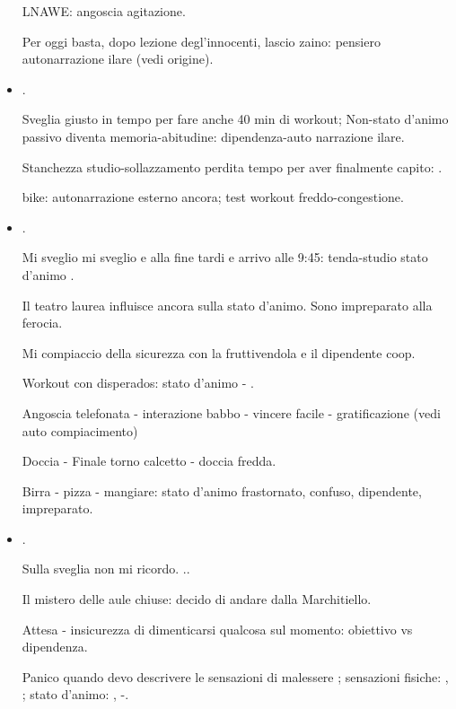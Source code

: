 \begin{itemize}
LNAWE: angoscia agitazione.

Per oggi basta, dopo lezione degl'innocenti, lascio zaino: pensiero autonarrazione ilare (vedi origine).

\item {}.

Sveglia giusto in tempo per fare anche 40 min di workout; Non-stato d'animo passivo diventa memoria-abitudine: dipendenza-auto narrazione ilare.

Stanchezza studio-sollazzamento perdita tempo per aver finalmente capito: .

 bike: autonarrazione esterno ancora; test workout freddo-congestione.

\item {}.

Mi sveglio mi sveglio e alla fine tardi e arrivo alle 9:45: tenda-studio stato d'animo .

Il teatro laurea influisce ancora sulla stato d'animo. Sono impreparato alla ferocia.

Mi compiaccio della sicurezza con la fruttivendola e il dipendente coop.

Workout con disperados: stato d'animo - .

Angoscia telefonata - interazione babbo - vincere facile - gratificazione (vedi auto compiacimento)

Doccia - Finale torno calcetto - doccia fredda.

Birra - pizza - mangiare: stato d'animo frastornato, confuso, dipendente, impreparato.

\item {}.

Sulla sveglia non mi ricordo. ..

Il mistero delle aule chiuse: decido di andare dalla Marchitiello.

Attesa -  insicurezza di dimenticarsi qualcosa sul momento: obiettivo vs dipendenza.

Panico quando devo descrivere le sensazioni di malessere ; sensazioni fisiche: , ; stato d'animo: , -.


\end{itemize}
